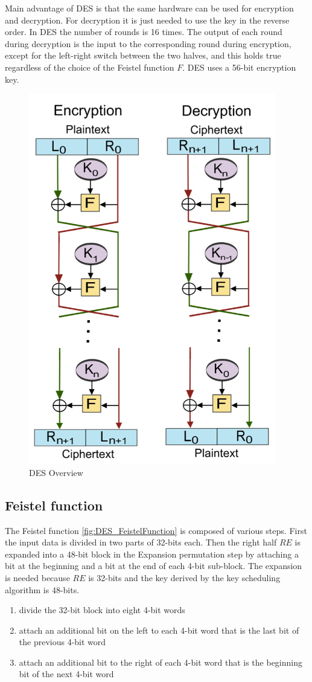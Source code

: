 Main advantage of DES is that the same hardware can be used for encryption and decryption. For decryption it is just needed to use the key in the reverse order. In DES the number of rounds is 16 times. The output of each round during decryption is the input to the corresponding round during encryption, except for the left-right switch between the two halves, and this holds true regardless of the choice of the Feistel function $F$. DES uses a 56-bit encryption key.

\begin{figure}
	\centering
	\includegraphics[width=0.7\linewidth]{Images/Chapter3/DES_Overwiew}
	\caption{DES Overview}
	\label{fig:DES_Overwiew}
\end{figure}

\subsection{Feistel function}

The Feistel function \ref{fig:DES_FeistelFunction} is composed of various steps. First the input data is divided in two parts of 32-bits each. Then the right half $RE$ is expanded into a 48-bit block in the Expansion permutation step by attaching a bit at the beginning and a bit at the end of each 4-bit sub-block. The expansion is needed because $RE$ is 32-bits and the key derived by the key scheduling algorithm is 48-bits.
\begin{enumerate}
	\item divide the 32-bit block into eight 4-bit words
	\item attach an additional bit on the left to each 4-bit word that is the last bit of the previous 4-bit word
	\item attach an additional bit to the right of each 4-bit word that is the beginning bit of the next 4-bit word
\end{enumerate}

